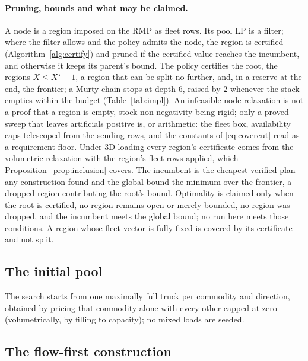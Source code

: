 \paragraph{Pruning, bounds and what may be claimed.}
A node is a region imposed on the RMP as fleet rows. Its pool LP is a
filter; where the filter allows and the policy admits the node, the
region is certified (Algorithm~\ref{alg:certify}) and pruned if the
certified value reaches the incumbent, and otherwise it keeps its
parent's bound. The policy certifies the root, the regions
$X\le X^{\star}-1$, a region that can be split no further, and, in a
reserve at the end, the frontier; a Murty chain stops at depth $6$,
raised by $2$ whenever the stack empties within the budget
(Table~\ref{tab:impl}). An infeasible node relaxation is not a proof
that a region is empty, stock non-negativity being rigid; only a proved
sweep that leaves artificials positive is, or arithmetic: the fleet box, availability caps telescoped from the sending rows, and
the constants of \eqref{eq:covercut} read as a requirement floor. Under
3D loading every region's certificate comes from the volumetric
relaxation with the region's fleet rows applied, which
Proposition~\ref{prop:inclusion} covers. The incumbent is the cheapest
verified plan any construction found and the global bound the minimum
over the frontier, a dropped region contributing the root's bound.
Optimality is claimed only when the root is certified, no region
remains open or merely bounded, no region was dropped, and the
incumbent meets the global bound; no run here meets those conditions. A
region whose fleet vector is fully fixed is covered by its certificate
and not split.



\subsection{The initial pool}
\label{sec:initcols}
The search starts from one maximally full truck per commodity and
direction, obtained by pricing that commodity alone with every other
capped at zero (volumetrically, by filling to capacity); no mixed loads
are seeded.

\subsection{The flow-first construction}
\label{sec:relaxfix-flow}

